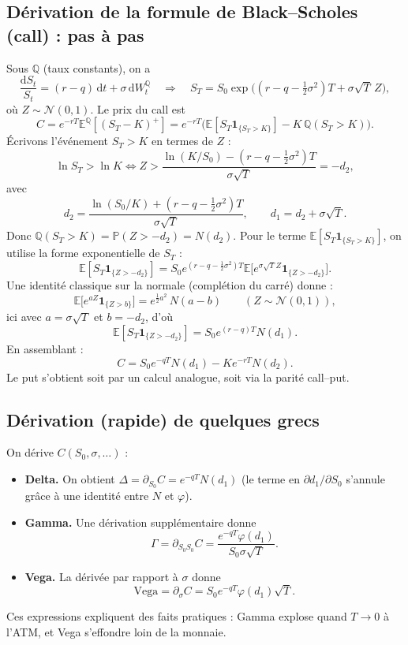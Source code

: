 \documentclass[11pt,a4paper]{report}
\theoremstyle{definition}
\theoremstyle{plain}
\theoremstyle{remark}
\newcommand{\dd}{\mathrm{d}}
\newcommand{\E}{\mathbb{E}}
\newcommand{\Prob}{\mathbb{P}}
\newcommand{\1}{\mathbf{1}}
\newcommand{\Normal}{\mathcal{N}}
\newcommand{\Qmeas}{\mathbb{Q}}
\begin{document}
\subsection*{Dérivation de la formule de Black--Scholes (call) : pas à pas}
Sous $\Qmeas$ (taux constants), on a
\[
\frac{\dd S_t}{S_t}=(r-q)\,\dd t+\sigma\,\dd W_t^{\Qmeas}
\quad\Rightarrow\quad
S_T=S_0\exp\Big((r-q-\tfrac12\sigma^2)T+\sigma\sqrt{T}\,Z\Big),
\]
où $Z\sim\Normal(0,1)$.
Le prix du call est
\[
C=e^{-rT}\E^{\Qmeas}[(S_T-K)^+]
  =e^{-rT}\Big(\E[S_T\1_{\{S_T>K\}}]-K\,\Qmeas(S_T>K)\Big).
\]
Écrivons l'événement $S_T>K$ en termes de $Z$ :
\[
\ln S_T > \ln K
\iff
Z > \frac{\ln(K/S_0)-(r-q-\tfrac12\sigma^2)T}{\sigma\sqrt{T}}
      =-d_2,
\]
avec
\[
d_2=\frac{\ln(S_0/K)+(r-q-\tfrac12\sigma^2)T}{\sigma\sqrt{T}},\qquad d_1=d_2+\sigma\sqrt{T}.
\]
Donc $\Qmeas(S_T>K)=\Prob(Z>-d_2)=N(d_2)$.
Pour le terme $\E[S_T\1_{\{S_T>K\}}]$, on utilise la forme exponentielle de $S_T$ :
\[
\E[S_T\1_{\{Z>-d_2\}}]=S_0e^{(r-q-\tfrac12\sigma^2)T}\E\big[e^{\sigma\sqrt{T}Z}\1_{\{Z>-d_2\}}\big].
\]
Une identité classique sur la normale (complétion du carré) donne :
\[
\E\big[e^{aZ}\1_{\{Z>b\}}\big]=e^{\tfrac12 a^2}\,N(a-b)\qquad (Z\sim\Normal(0,1)),
\]
ici avec $a=\sigma\sqrt{T}$ et $b=-d_2$, d'où
\[
\E[S_T\1_{\{Z>-d_2\}}]=S_0e^{(r-q)T}N(d_1).
\]
En assemblant :
\[
\boxed{C=S_0e^{-qT}N(d_1)-Ke^{-rT}N(d_2).}
\]
Le put s'obtient soit par un calcul analogue, soit via la parité call--put.

\subsection*{Dérivation (rapide) de quelques grecs}
On dérive $C(S_0,\sigma,\ldots)$ :
\begin{itemize}[leftmargin=*]
\item \textbf{Delta.} On obtient $\Delta=\partial_{S_0}C=e^{-qT}N(d_1)$ (le terme en $\partial d_1/\partial S_0$ s'annule grâce à une identité entre $N$ et $\varphi$).
\item \textbf{Gamma.} Une dérivation supplémentaire donne
\[
\Gamma=\partial_{S_0S_0}C=\frac{e^{-qT}\varphi(d_1)}{S_0\sigma\sqrt{T}}.
\]
\item \textbf{Vega.} La dérivée par rapport à $\sigma$ donne
\[
\text{Vega}=\partial_\sigma C=S_0e^{-qT}\varphi(d_1)\sqrt{T}.
\]
\end{itemize}
Ces expressions expliquent des faits pratiques : Gamma explose quand $T\to 0$ à l'ATM, et Vega s'effondre loin de la monnaie.


\end{document}
